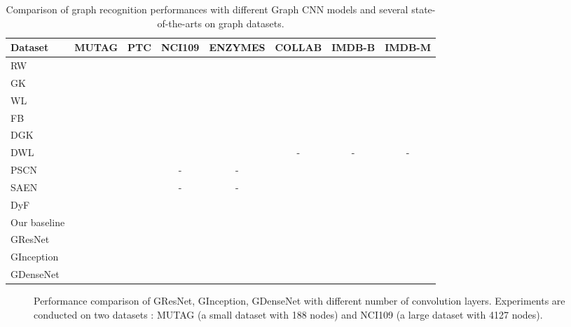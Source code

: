 \documentclass[journal]{IEEEtran}
\begin{document}
\begin{table*}[!t]
\centering
	\renewcommand\arraystretch{1.3}
	\caption{Comparison of graph recognition performances with different Graph CNN models and several state-of-the-arts on graph datasets.}
	\footnotesize
	\begin{tabular}[width=0.8\linewidth]{l|ccccccc} \hline  Dataset & MUTAG &PTC  &NCI109 &ENZYMES &COLLAB &IMDB-B &IMDB-M\\
		\hline	\hline
		RW \cite{rw2003}   & &  &  &  &   &   &\\
		GK \cite{gk2009}  & &  &  &   &   &   &\\
		WL \cite{wl2011}  & &  &  &   &   &   &\\
		FB \cite{BrunaZSL13}  & &  &  &   &   &   &\\
		DGK \cite{DGKandDWL2015}  & &  &  &   &   &   &\\
		DWL \cite{DGKandDWL2015}  & &  &  &   &-  &-  &-\\
		PSCN \cite{niepert2016learning} & &   &-              &-                &   &  &\\
		SAEN \cite{saen2017} & &   &-              &-                &   &  &\\
		DyF \cite{DyGraph2017}  & &  & &  &   &  &\\
		\hline \hline
		Our baseline   &  &  &  &  &  &  &\\		
		G\underline{\hspace{0.5em}}ResNet  & & & &  &  &\bm{} &\bm{}\\
		G\underline{\hspace{0.5em}}Inception  & \bm{}  &   &  &\bm{}  &  &  &\\
		G\underline{\hspace{0.5em}}DenseNet   &  &\bm{}    &\bm{}  &  &\bm{}  &  & \\
		\hline
	\end{tabular} \vspace{0.15cm}
	\label{compres} \vspace{-0.1cm}
\end{table*}


\begin{figure*}[ht]
	\centering
\vspace{-1em}
	\caption{Performance comparison of G\underline{\hspace{0.5em}}ResNet, G\underline{\hspace{0.5em}}Inception, G\underline{\hspace{0.5em}}DenseNet with different number of convolution layers. Experiments are conducted on two datasets : MUTAG (a small dataset with 188 nodes) and NCI109 (a large dataset with 4127 nodes). }
	\label{comparisonLayers}
\end{figure*}
\end{document}
